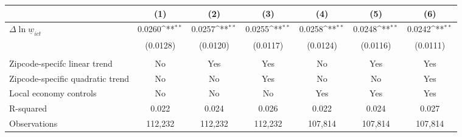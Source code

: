 {
\def\sym#1{\ifmmode^{#1}\else\(^{#1}\)\fi}
\begin{tabular}{l*{6}{c}}
\hline\hline
          &\multicolumn{1}{c}{(1)}         &\multicolumn{1}{c}{(2)}         &\multicolumn{1}{c}{(3)}         &\multicolumn{1}{c}{(4)}         &\multicolumn{1}{c}{(5)}         &\multicolumn{1}{c}{(6)}         \\
\hline
$\Delta \ln \underline{w}_{ict}$&   0.0260\sym{**} &   0.0257\sym{**} &   0.0255\sym{**} &   0.0258\sym{**} &   0.0248\sym{**} &   0.0242\sym{**} \\
          & (0.0128)         & (0.0120)         & (0.0117)         & (0.0124)         & (0.0116)         & (0.0111)         \\
\hline
\vspace{-2mm}&                  &                  &                  &                  &                  &                  \\
Zipcode-specifc linear trend&       No         &      Yes         &      Yes         &       No         &      Yes         &      Yes         \\
Zipcode-specific quadratic trend&       No         &       No         &      Yes         &       No         &       No         &      Yes         \\
Local economy controls&       No         &       No         &       No         &      Yes         &      Yes         &      Yes         \\
R-squared &    0.022         &    0.024         &    0.026         &    0.022         &    0.024         &    0.027         \\
Observations&  112,232         &  112,232         &  112,232         &  107,814         &  107,814         &  107,814         \\
\hline\hline
\end{tabular}
}
